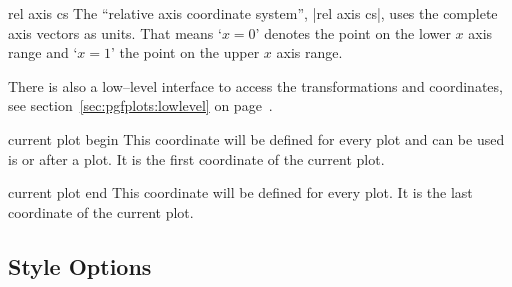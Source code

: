 \begin{coordinatesystem}{rel axis cs}
The ``relative axis coordinate system'', |rel axis cs|, uses the complete axis vectors as units. That means `$x=0$' denotes the point on the lower $x$ axis range and `$x=1$' the point on the upper $x$ axis range.

\pgfplotsexpensiveexample
\begin{codeexample}[]
\end{codeexample}

\pgfplotsexpensiveexample
\begin{codeexample}[]
\end{codeexample}

There is also a low--level interface to access the transformations and coordinates, see section~\ref{sec:pgfplots:lowlevel} on page~\pageref{sec:pgfplots:lowlevel}.
\end{coordinatesystem}

\begin{predefinednode}{current plot begin}
	This coordinate will be defined for every plot and can be used is  or after a plot. It is the first coordinate of the current plot.	
\end{predefinednode}

\begin{predefinednode}{current plot end}
	This coordinate will be defined for every plot. It is the last coordinate of the current plot.	
\end{predefinednode}



\subsection{Style Options}
\label{sec:styles}
